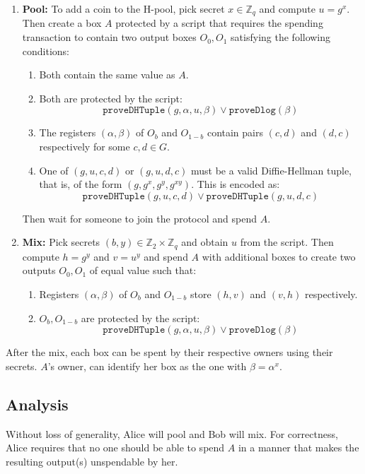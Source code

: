 \documentclass[runningheads]{llncs}
\newcommand{\langname}{ErgoScript\xspace}
\begin{document}
\begin{enumerate}
	\item \textbf{Pool:} To add a coin to the H-pool, pick secret $x\in \mathbb{Z}_q$ and compute $u = g^x$. Then create a box $A$ protected by a script that requires the spending transaction to contain two output boxes $O_0, O_1$ satisfying the following conditions: 
	\begin{enumerate}
		\item Both contain the same value as $A$.
		\item Both are protected by the script: $$\texttt{proveDHTuple}(g, \alpha, u, \beta) \lor \texttt{proveDlog}(\beta)$$
        \item The registers $(\alpha, \beta)$ of $O_b$ and $O_{1-b}$ contain pairs $(c, d)$ and $(d, c)$ respectively for some $c, d\in G$. 
		\item One of $(g, u, c, d)$ or $(g, u, d, c)$ must be a valid Diffie-Hellman tuple, that is, of the form $(g, g^x, g^y, g^{xy})$. This is encoded %
		as: $$\texttt{proveDHTuple}(g, u, c, d)\lor \texttt{proveDHTuple}(g, u, d, c)$$
	\end{enumerate}
	Then wait for someone to join the protocol and spend $A$.

	\item \textbf{Mix:} Pick secrets $(b, y) \in \mathbb{Z}_2\times \mathbb{Z}_q$ and obtain $u$ from the script. Then compute $h= g^y$ and $v = u^y$ and spend $A$ with additional boxes to create two outputs $O_0, O_1$ of equal value such that:
	\begin{enumerate}
		\item Registers $(\alpha, \beta)$ of $O_b$ and $O_{1-b}$ store $(h, v)$ and $(v, h)$ respectively. 
		\item $O_b, O_{1-b}$ are protected by the script: $$\texttt{proveDHTuple}(g, \alpha, u, \beta)\lor \texttt{proveDlog}(\beta)$$
	\end{enumerate}
\end{enumerate}
After the mix, each box can be spent by their respective owners using their secrets. 
$A$'s owner, can identify her box as the one with $\beta = \alpha^x$. 

\subsection{Analysis}

Without loss of generality, Alice will pool and Bob will mix. 
For correctness, Alice requires that no one should be able to spend $A$ in a manner that makes the resulting output(s) unspendable by her.
\end{document}
